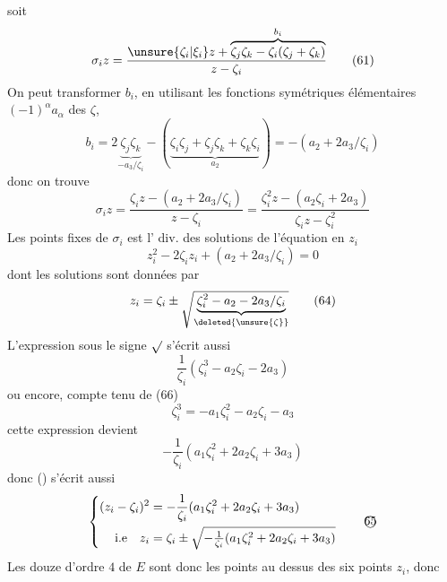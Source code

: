 soit
\[
 \sigma_i z=\frac{\unsure{\zeta_i|\xi_i}z+\overbrace{\zeta_j\zeta_k-\zeta_i(\zeta_j+\zeta_k)}^{b_i}}{z-\zeta_i}
 \tag*{(61)}
\]
On peut transformer $b_i$, en utilisant les fonctions symétriques élémentaires $(-1)^\alpha a_\alpha$ des $\zeta$,
\[
 b_i=2\underbrace{\zeta_j\zeta_k}_{-a_3/\zeta_i}-
 (\underbrace{\zeta_i\zeta_j+\zeta_j\zeta_k+\zeta_k\zeta_i}_{a_2})
 =-(a_2+2a_3/\zeta_i)
\]
donc on trouve
\[
 \sigma_i z=\frac{\zeta_i z-(a_2+2a_3/\zeta_i)}{z-\zeta_i}
 =\frac{\zeta_i^2z-(a_2\zeta_i+2a_3)}{\zeta_i z-\zeta_i^2}
 \tag*{(62)}
\]
Les  points fixes de $\sigma_i$ est l' div. des solutions de l'équation en $z_i$
\[
 z_i^2-2\zeta_i z_i+(a_2+2a_3/\zeta_i)=0 \tag*{(63)}
\]
dont les solutions sont données par
\[
 z_i=\zeta_i\pm\sqrt{\underbrace{\zeta_i^2-a_2-2a_3/\zeta_i}_{\deleted{\unsure{\zeta}}}} \tag*{(64)}
\]
L'expression sous le signe $\sqrt{\vphantom{x}}$ s'écrit aussi
\[
 \frac{1}{\zeta_i}(\zeta_i^3-a_2\zeta_i-2a_3)
\]
ou encore, compte tenu de (66)
\[
 \zeta_i^3=-a_1\zeta_i^2-a_2\zeta_i-a_3
\]
 cette expression devient
\[
 -\frac{1}{\zeta_i}(a_1\zeta_i^2+2a_2\zeta_i+3a_3)
\]
donc () s'écrit aussi
\[
 \left\{\begin{aligned}
 (z_i-\zeta_i)^2&=-\frac{1}{\zeta_i}(a_1\zeta_i^2+2a_2\zeta_i+3a_3)\\
 \text{i.e}\quad z_i&=\zeta_i\pm\sqrt{-\tfrac1{\zeta_i}(a_1\zeta_i^2+2a_2\zeta_i+3a_3)}
 \end{aligned}\right. \tag*{\textcircled{65}}
\]
Les douze  d'ordre $4$ de $E$ sont donc les points au dessus des six points $z_i$, donc  
